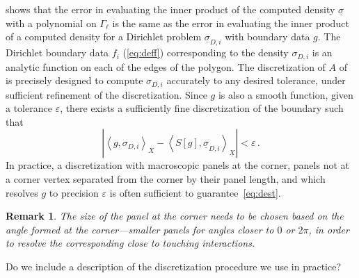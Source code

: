 \documentclass[12pt,times]{elsarticle}
\newcommand{\usigma}{\underline{\sigma}}
\newcommand{\uX}{\underline{X}}
\newcommand{\note}[1]{{\color{red} #1}}
\newtheorem{rem}{Remark}
\begin{document}
{ shows that the error in evaluating the inner product of the computed density $\usigma$ with a polynomial on
$\Gamma_{\ell}$ is the same as the error in evaluating the inner product of a computed density for a Dirichlet problem $\usigma_{D,i}$ with boundary data $g$. 
The Dirichlet boundary data $f_{i}$ (\cref{eq:deff}) corresponding to the density $\sigma_{D,i}$ is an analytic function on each of the edges of the polygon. 
The discretization of $A$ of~\cite{hoskins2019numerical} is precisely designed to compute $\sigma_{D,i}$ accurately to any desired tolerance, under sufficient refinement of the discretization. Since $g$ is also a smooth function, given a tolerance $\varepsilon$, there exists a sufficiently fine discretization of the boundary such that
\begin{equation}
\left| \left< g, \sigma_{D,i} \right>_{X} - \left< S[g], \usigma_{D,i} \right>_{\uX} \right| < \varepsilon \, . \label{eq:dest}
\end{equation}
In practice, a discretization with macroscopic panels at the corner, panels not at a corner vertex separated from the corner by their panel length, and which resolves $g$ to precision $\varepsilon$ is often sufficient to guarantee~\cref{eq:dest}. 
\begin{rem}
The size of the panel at the corner needs to be chosen based on the angle formed at the corner---smaller panels for angles closer to $0$ or $2\pi$, in order to resolve the corresponding close to touching interactions.
\end{rem}
} 

\note{Do we include a description of the discretization procedure we use in practice?}
 
 
 
\end{document}
